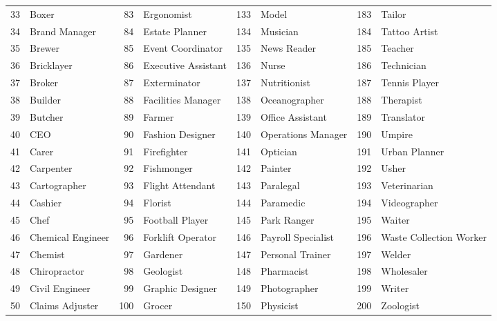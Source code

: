 {\begin{longtable}{r p{2.5cm} r p{2.5cm} r p{2.5cm} r p{2.5cm}}
33 & Boxer                   & 83  & Ergonomist              & 133 & Model                   & 183 & Tailor                  \\
34 & Brand Manager           & 84  & Estate Planner          & 134 & Musician                & 184 & Tattoo Artist           \\
35 & Brewer                  & 85  & Event Coordinator       & 135 & News Reader             & 185 & Teacher                 \\
36 & Bricklayer              & 86  & Executive Assistant     & 136 & Nurse                   & 186 & Technician              \\
37 & Broker                  & 87  & Exterminator            & 137 & Nutritionist            & 187 & Tennis Player           \\
38 & Builder                 & 88  & Facilities Manager      & 138 & Oceanographer           & 188 & Therapist               \\
39 & Butcher                 & 89  & Farmer                  & 139 & Office Assistant        & 189 & Translator              \\
40 & CEO                     & 90  & Fashion Designer        & 140 & Operations Manager      & 190 & Umpire                  \\
41 & Carer                   & 91  & Firefighter             & 141 & Optician                & 191 & Urban Planner           \\
42 & Carpenter               & 92  & Fishmonger              & 142 & Painter                 & 192 & Usher                   \\
43 & Cartographer            & 93  & Flight Attendant        & 143 & Paralegal               & 193 & Veterinarian            \\
44 & Cashier                 & 94  & Florist                 & 144 & Paramedic               & 194 & Videographer            \\
45 & Chef                    & 95  & Football Player         & 145 & Park Ranger             & 195 & Waiter                  \\
46 & Chemical Engineer       & 96  & Forklift Operator       & 146 & Payroll Specialist      & 196 & Waste Collection Worker \\
47 & Chemist                 & 97  & Gardener                & 147 & Personal Trainer        & 197 & Welder                  \\
48 & Chiropractor            & 98  & Geologist               & 148 & Pharmacist              & 198 & Wholesaler              \\
49 & Civil Engineer          & 99  & Graphic Designer        & 149 & Photographer            & 199 & Writer                  \\
50 & Claims Adjuster         & 100 & Grocer                  & 150 & Physicist               & 200 & Zoologist               \\

\end{longtable}
}